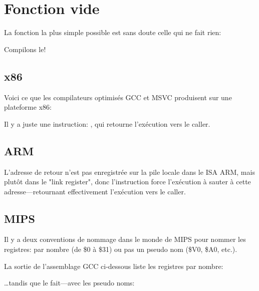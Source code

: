 \section{Fonction vide}
\label{empty_func}

La fonction la plus simple possible est sans doute celle qui ne fait rien:



Compilons le!

\subsection{x86}

Voici ce que les compilateurs optimisés GCC et MSVC produisent sur une plateforme x86:



Il y a juste une instruction: \RET, qui retourne l'exécution vers le \gls{caller}. %

\subsection{ARM}



L'adresse de retour n'est pas enregistrée sur la pile locale dans le \ac{ISA} ARM, mais plutôt dans le "link register", %
donc l'instruction  force l'exécution à sauter à cette adresse---retournant effectivement l'exécution vers le \gls{caller}.

\subsection{MIPS}

Il y a deux conventions de nommage dans le monde de MIPS pour nommer les registres:
par nombre (de \$0 à \$31) ou pas un pseudo nom (\$V0, \$A0, etc.).

La sortie de l'assemblage GCC ci-dessous liste les registres par nombre:



\dots tandis que \IDA le fait---avec les pseudo noms:

